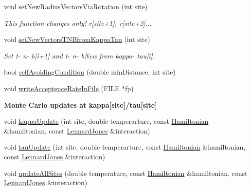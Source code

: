 \begin{DoxyCompactItemize}
void \hyperlink{class_p_c_a_1_1_polymer_m_c_a80c92a94292d085a0d0ce0563ae0a1fd}{set\+New\+Radius\+Vectors\+Via\+Rotation} (int site)
\begin{DoxyCompactList}\small\item\em This function changes only! r\mbox{[}site+1\mbox{]}, r\mbox{[}site+2\mbox{]}... \end{DoxyCompactList}\item 
void \hyperlink{class_p_c_a_1_1_polymer_m_c_ab7ec6ffe521bf27c218f4a6eac6c394b}{set\+New\+Vectors\+T\+N\+Bfrom\+Kappa\+Tau} (int site)
\begin{DoxyCompactList}\small\item\em Set t-\/ n-\/ b\mbox{[}i+1\mbox{]} and t-\/ n-\/ b\+New from kappa-\/ tau\mbox{[}i\mbox{]}. \end{DoxyCompactList}\item 
bool \hyperlink{class_p_c_a_1_1_polymer_m_c_a6f7e8a68070a688e1d6b0dc00a13b27c}{self\+Avoiding\+Condition} (double min\+Distance, int site)
\item 
void \hyperlink{class_p_c_a_1_1_polymer_m_c_aabe0e104c1f34ebe2174a650b7cbe963}{write\+Acceptence\+Rate\+In\+File} (F\+I\+LE $\ast$fp)
\end{DoxyCompactItemize}
\begin{Indent}{\bf Monte Carlo updates at kappa\mbox{[}site\mbox{]}/tau\mbox{[}site\mbox{]}}\par
\begin{DoxyCompactItemize}
\item 
void \hyperlink{class_p_c_a_1_1_polymer_m_c_a8d70317037e998d3a27618a9ecb60fd8}{kappa\+Update} (int site, double temperarture, const \hyperlink{class_p_c_a_1_1_hamiltonian}{Hamiltonian} \&hamiltonian, const \hyperlink{class_p_c_a_1_1_lennard_jones}{Lennard\+Jones} \&interaction)
\item 
void \hyperlink{class_p_c_a_1_1_polymer_m_c_a087b8392c8ec8eea5c069a1be4c46d2f}{tau\+Update} (int site, double temperarture, const \hyperlink{class_p_c_a_1_1_hamiltonian}{Hamiltonian} \&hamiltonian, const \hyperlink{class_p_c_a_1_1_lennard_jones}{Lennard\+Jones} \&interaction)
\item 
void \hyperlink{class_p_c_a_1_1_polymer_m_c_a4bb5653f7159bce31cc0e476b4fd4c8e}{update\+All\+Sites} (double temperature, const \hyperlink{class_p_c_a_1_1_hamiltonian}{Hamiltonian} \&hamiltonian, const \hyperlink{class_p_c_a_1_1_lennard_jones}{Lennard\+Jones} \&interaction)
\end{DoxyCompactItemize}
\end{Indent}
